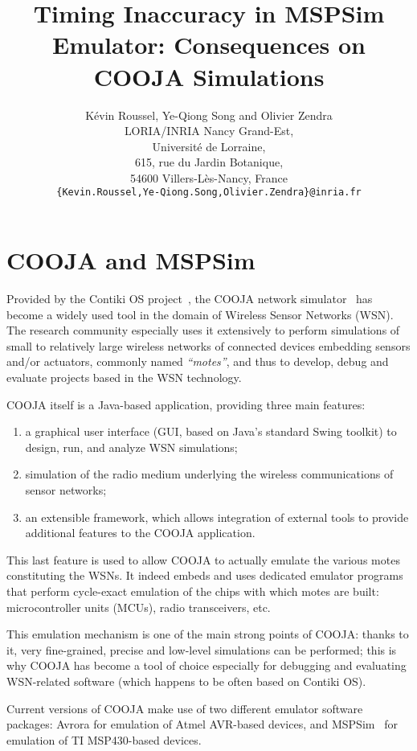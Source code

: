 \documentclass[a4paper,10pt]{article}
\title{Timing Inaccuracy in MSPSim Emulator: Consequences on COOJA Simulations}
\author{
K\'evin Roussel, Ye-Qiong Song and Olivier Zendra\\
LORIA/INRIA Nancy Grand-Est,\\
             Universit\'e de Lorraine,\\
             615, rue du Jardin Botanique,\\
             54600 Villers-L\`es-Nancy, France\\
\texttt{\{Kevin.Roussel,Ye-Qiong.Song,Olivier.Zendra\}@inria.fr}
}
\date{}
\begin{document}
\maketitle



\section{COOJA and MSPSim}

Provided by the Contiki OS project~\cite{ContikiOS}, the COOJA network
simulator~\cite{Cooja} has become a widely used tool in the domain of
Wireless Sensor Networks (WSN). The research community especially uses
it extensively to perform simulations of small to relatively large wireless
networks of connected devices embedding sensors and/or actuators, commonly
named \emph{``motes''}, and thus to develop, debug and evaluate projects
based in the WSN technology.

COOJA itself is a Java-based application, providing three main features:
\begin{enumerate}
\item a graphical user interface (GUI, based on Java's standard Swing toolkit)
to design, run, and analyze WSN simulations;
\item simulation of the radio medium underlying the wireless communications
of sensor networks;
\item an extensible framework, which allows integration of external tools
to provide additional features to the COOJA application.
\end{enumerate}
This last feature is used to allow COOJA to actually emulate the various
motes constituting the WSNs. It indeed embeds and uses dedicated emulator
programs that perform cycle-exact emulation of the chips with which motes
are built: microcontroller units (MCUs), radio transceivers, etc.

This emulation mechanism is one of the main strong points of COOJA:
thanks to it, very fine-grained, precise and low-level simulations
can be performed; this is why COOJA has become a tool of choice especially
for debugging and evaluating WSN-related software (which happens to be
often based on Contiki OS).

Current versions of COOJA make use of two different emulator software
packages: Avrora for emulation of Atmel AVR-based devices, and
MSPSim~\cite{MSPSim} for emulation of TI MSP430-based devices.
\end{document}
